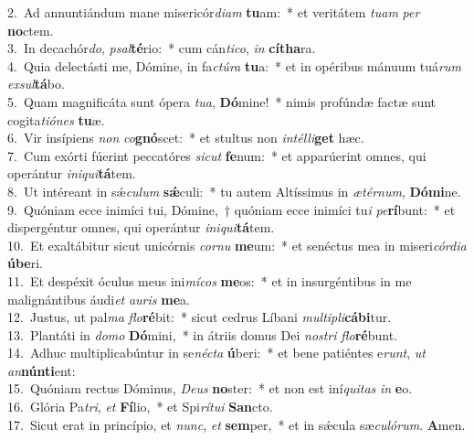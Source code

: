 {2.~}Ad annuntiándum mane misericór\textit{di}\textit{am} \textbf{tu}am:~* et veritátem \textit{tu}\textit{am} \textit{per} \textbf{no}ctem.\\
{3.~}In decachór\textit{do}, \textit{psal}\textbf{té}rio:~* cum cán\textit{ti}\textit{co}, \textit{in} \textbf{cí}\textbf{tha}ra.\\
{4.~}Quia delectásti me, Dómine, in fa\textit{ctú}\textit{ra} \textbf{tu}a:~* et in opéribus mánuum tuá\textit{rum} \textit{ex}\textit{sul}\textbf{tá}bo.\\
{5.~}Quam magnificáta sunt ópera \textit{tu}\textit{a}, \textbf{Dó}mine!~* nimis profúndæ factæ sunt cogita\textit{ti}\textit{ó}\textit{nes} \textbf{tu}æ.\\
{6.~}Vir insípiens \textit{non} \textit{co}\textbf{gnó}scet:~* et stultus non \textit{in}\textit{tél}\textit{li}\textbf{get} hæc.\\
{7.~}Cum exórti fúerint peccatóres \textit{si}\textit{cut} \textbf{fe}num:~* et apparúerint omnes, qui operántur \textit{i}\textit{ni}\textit{qui}\textbf{tá}tem.\\
{8.~}Ut intéreant in sǽ\textit{cu}\textit{lum} \textbf{sǽ}culi:~* tu autem Altíssimus in \textit{æ}\textit{tér}\textit{num}, \textbf{Dó}\textbf{mi}ne.\\
{9.~}Quóniam ecce inimíci tui, Dómine,~† quóniam ecce inimíci tu\textit{i} \textit{pe}\textbf{rí}bunt:~* et dispergéntur omnes, qui operántur \textit{i}\textit{ni}\textit{qui}\textbf{tá}tem.\\
{10.~}Et exaltábitur sicut unicórnis \textit{cor}\textit{nu} \textbf{me}um:~* et senéctus mea in miseri\textit{cór}\textit{di}\textit{a} \textbf{ú}\textbf{be}ri.\\
{11.~}Et despéxit óculus meus ini\textit{mí}\textit{cos} \textbf{me}os:~* et in insurgéntibus in me malignántibus áudi\textit{et} \textit{au}\textit{ris} \textbf{me}a.\\
{12.~}Justus, ut pal\textit{ma} \textit{flo}\textbf{ré}bit:~* sicut cedrus Líbani \textit{mul}\textit{ti}\textit{pli}\textbf{cá}\textbf{bi}tur.\\
{13.~}Plantáti in \textit{do}\textit{mo} \textbf{Dó}mini,~* in átriis domus Dei \textit{no}\textit{stri} \textit{flo}\textbf{ré}bunt.\\
{14.~}Adhuc multiplicabúntur in se\textit{né}\textit{cta} \textbf{ú}beri:~* et bene patiéntes e\textit{runt}, \textit{ut} \textit{an}\textbf{nún}\textbf{ti}ent:\\
{15.~}Quóniam rectus Dóminus, \textit{De}\textit{us} \textbf{no}ster:~* et non est iní\textit{qui}\textit{tas} \textit{in} \textbf{e}o.\\
{16.~}Glória Pa\textit{tri}, \textit{et} \textbf{Fí}lio,~* et Spi\textit{rí}\textit{tu}\textit{i} \textbf{San}cto.\\
{17.~}Sicut erat in princípio, et \textit{nunc}, \textit{et} \textbf{sem}per,~* et in sǽcula sæ\textit{cu}\textit{ló}\textit{rum}. \textbf{A}men.\\
